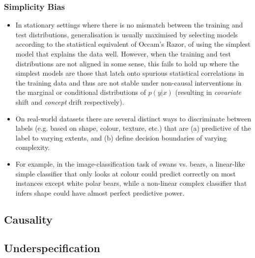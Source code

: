 \subsubsection{Simplicity Bias \citep{shah2020pitfalls}}
\begin{itemize}
  \item In stationary settings where there is no mismatch between the training and test 
    distributions, generalisation is usually maximised by selecting models according to the 
    statistical equivalent of Occam's Razor, of using the simplest model that explains the data 
    well. However, when the training and test distributions are not aligned in some sense, this 
    fails to hold up where the simplest models are those that latch onto spurious statistical 
    correlations in the training data and thus are not stable under non-causal interventions in 
    the marginal or conditional distributions of $p(y|x)$ (resulting in \emph{covariate} shift 
    and \emph{concept} drift respectively).
  \item On real-world datasets there are several distinct ways to discriminate between labels (e.g. 
    based on shape, colour, texture, etc.) that are (a) predictive of the label to varying extents, 
    and (b) define decision boundaries of varying complexity. 
  \item For example, in the image-classification task of swans vs. bears, a linear-like simple 
    classifier that only looks at colour could predict correctly on most instances except white 
    polar bears, while a non-linear complex classifier that infers shape could have almost perfect 
    predictive power.
\end{itemize}

\subsection{Causality}%
\subsection{Underspecification}%
\label{sub:underspecification}

